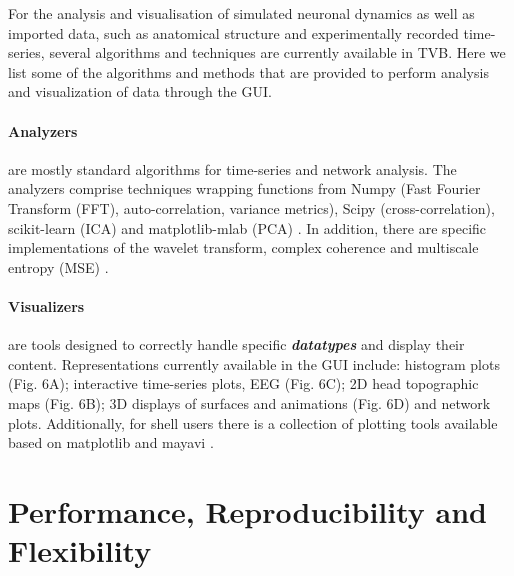 \documentclass{bioinfo}
\newcommand*{\tvbdatatype}[1]{\textbf{\emph{#1}}}   %
\begin{document}
\begin{methods}
    For the analysis and visualisation of simulated neuronal dynamics as well
    as imported data, such as anatomical structure and experimentally
    recorded time-series, several algorithms and techniques are currently
    available in  TVB. Here we list some of the algorithms and methods that
    are provided to perform analysis and visualization of data through the GUI.
    
    \paragraph{Analyzers \textcolon} are mostly standard algorithms for 
    time-series and network analysis. The analyzers comprise techniques 
    wrapping functions from Numpy (Fast Fourier Transform (FFT), 
    auto-correlation, variance metrics), Scipy (cross-correlation), 
    scikit-learn (ICA) \citep{scikit-learn} and matplotlib-mlab (PCA) 
    \citep{Hunter_2007}. In addition, there are specific implementations of
    the wavelet transform, complex coherence \citep{Nolte_2004a,Freyer_2012a} 
    and multiscale entropy (MSE) \citep{Costa_2002a, Costa_2005, Lake_2011}.
    
    \paragraph{Visualizers \textcolon} are tools designed to correctly handle 
    specific \tvbdatatype{datatypes} and display their content. Representations currently
    available in the GUI include: histogram plots (Fig. 6A); 
    interactive time-series plots, EEG (Fig. 6C); 2D head topographic
    maps (Fig. 6B);  3D displays of surfaces and animations 
    (Fig. 6D) and network plots. Additionally, for shell users
    there is a collection of plotting tools available  based on matplotlib and
    mayavi \citep{mayavi_2011}.
    



\end{methods}   
    
    \section{Performance, Reproducibility and Flexibility}\label{sec:PerformanceReproducibilityFlexibility}
\end{document}
